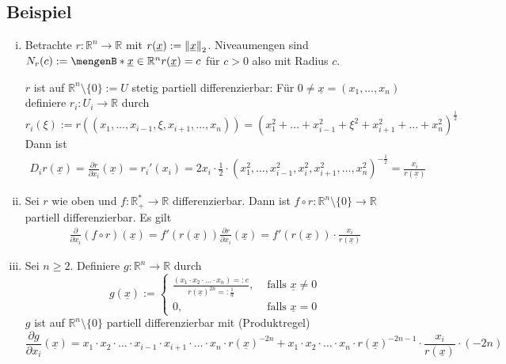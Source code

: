 \subsection[Beispiele zum partiellen Differenzieren]{Beispiel} %
\label{sub:64}
\begin{enumerate}[(i)]
	\item Betrachte $r : \mathds{R}^n \to \mathds{R}$ mit $r(\underline{x}) := \norm[2]{\underline{x}}$. Niveaumengen sind 
$N_r(c) := \set[\underline{x} \in \mathds{R}^n ]{r(\underline{x})= c} $ für $c >0$ also  mit Radius $c$. 

$r$ ist auf $\mathds{R}^n \setminus \{0\} := U$ stetig partiell differenzierbar: Für $0 \not= \underline{x} = (x_1, \ldots , x_n)$ definiere $r_i : U_i \to \mathds{R}$
durch $r_i ( \xi) := r((x_1, \ldots , x_{i-1}, \xi, x_{i+1}, \ldots , x_n)) = (x_1^2 + \ldots +  x_{i-1}^2 + \xi^2 + x_{i+1}^2 + \ldots + x_n^2)^{\frac{1}{2}}$ Dann ist
\begin{align*}
	D_i r(\underline{x}) = \frac{\partial r}{\partial x_i} ( \underline{x} ) = r_i' (x_i) 
	= 2 x_i \cdot \frac{1}{2} \cdot  (x_1^2, \ldots , x_{i-1}^2, x_i^2, x_{i+1}^2, \ldots , x_n^2)^{-\frac{1}{2}} = \frac{x_i}{r(\underline{x})} 
\end{align*}
\item Sei $r$ wie oben und $f : \mathds{R}_+^* \to \mathds{R}$ differenzierbar. Dann ist $f \circ r : \mathds{R}^n \setminus \{0\} \to \mathds{R}$ partiell differenzierbar.
Es gilt 
\begin{align*}
	\frac{\partial}{\partial x_i} (f \circ r) ( \underline{x} ) = f'(r(\underline{x})) \frac{\partial r}{\partial x_i} (\underline{x} )  = f'( r(\underline{x} )) \cdot 
	\frac{x_i}{r(\underline{x} )} 
\end{align*}
\item Sei $n \ge 2$. Definiere $g : \mathds{R}^n \to \mathds{R}$ durch 
\[
	g( \underline{x}) := \begin{cases}
		\frac{(x_1 \cdot x_2 \cdot \ldots \cdot x_n)  =: e}{r(\underline{x})^{2n} =: \frac{1}{d} } , &\text{ falls }\underline{x} \not= 0 \\
		0 , &\text{ falls } \underline{x} = 0 
	\end{cases}
\]
$g$ ist auf $\mathds{R}^n \setminus \{0\}$ partiell differenzierbar mit (Produktregel)
\[
	\frac{\partial g}{\partial x_i}( \underline{x} ) =  x_1 \cdot x_2 \cdot \ldots \cdot x_{i-1} \cdot x_{i+1} \cdot \ldots \cdot x_n \cdot r(\underline{x} )^{-2n}
	+ x_1 \cdot x_2 \cdot \ldots \cdot x_n \cdot r(\underline{x} )^{-2n-1} \cdot \frac{x_i}{r(\underline{x} )} \cdot (-2n)
\]
\end{enumerate}
